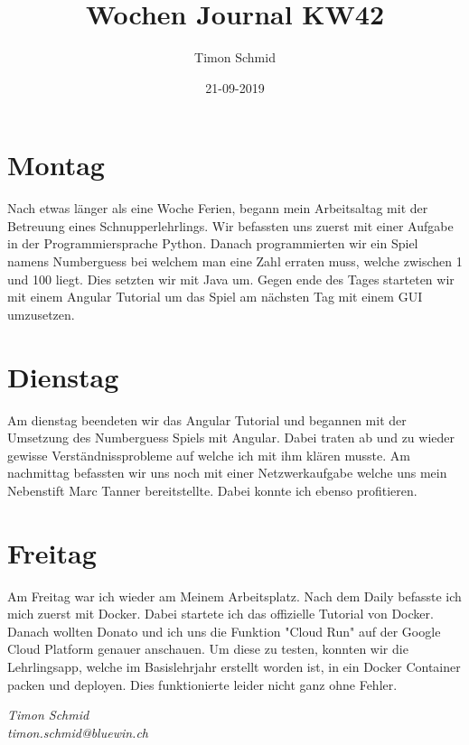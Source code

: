 \documentclass[12pt, titlepage]{article}
\title{Wochen Journal KW42}
\date{21-09-2019}
\author{Timon Schmid}
\begin{document}
  \maketitle

  \newpage


  \section{Montag}
  Nach etwas länger als eine Woche Ferien, begann mein Arbeitsaltag mit der Betreuung
  eines Schnupperlehrlings. Wir befassten uns zuerst mit einer Aufgabe in der
  Programmiersprache Python. Danach programmierten wir ein Spiel namens Numberguess
  bei welchem man eine Zahl erraten muss, welche zwischen 1 und 100 liegt.
  Dies setzten wir mit Java um. Gegen ende des Tages starteten wir mit einem Angular
  Tutorial um das Spiel am nächsten Tag mit einem GUI umzusetzen.

  \section{Dienstag}
  Am dienstag beendeten wir das Angular Tutorial und begannen mit der Umsetzung des
  Numberguess Spiels mit Angular. Dabei traten ab und zu wieder gewisse
  Verständnissprobleme auf welche ich mit ihm klären musste. Am nachmittag
  befassten wir uns noch mit einer Netzwerkaufgabe welche uns mein Nebenstift
  Marc Tanner bereitstellte. Dabei konnte ich ebenso profitieren.

  \section{Freitag}
  Am Freitag war ich wieder am Meinem Arbeitsplatz. Nach dem Daily befasste ich mich
  zuerst mit Docker. Dabei startete ich das offizielle Tutorial von Docker. Danach
  wollten Donato und ich uns die Funktion "Cloud Run" auf der Google Cloud Platform
  genauer anschauen. Um diese zu testen, konnten wir die Lehrlingsapp, welche im
  Basislehrjahr erstellt worden ist, in ein Docker Container packen und deployen.
  Dies funktionierte leider nicht ganz ohne Fehler.

  \textit{Timon Schmid \\ timon.schmid@bluewin.ch}
\end{document}
